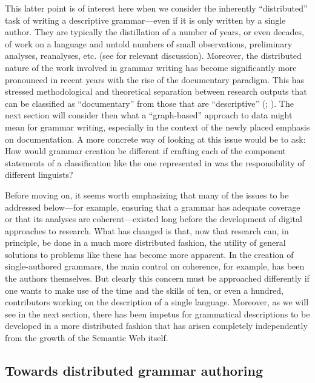 This latter point is of interest here when we consider the inherently
``distributed'' task of writing a descriptive grammar---even if it is only
written by a single author. They are typically the distillation of a number of
years, or even decades, of work on a language and untold numbers of small
observations, preliminary analyses, reanalyses, etc. (see
 for relevant discussion). Moreover, the
distributed nature of the work involved in grammar writing has become
significantly more pronounced in recent years with the rise of the documentary
paradigm. This has stressed methodological and theoretical separation between
research outputs that can be classified as ``documentary'' from those that are
``descriptive'' (;
). The next section will consider then what a
``graph-based'' approach to data might mean for grammar writing, especially in
the context of the newly placed emphasis on documentation. A more concrete way
of looking at this issue would be to ask: How would grammar creation be
different if crafting each of the component statements of a classification like
the one represented in  was the responsibility of different
linguists?

Before moving on, it seems worth emphasizing that many of the issues to be
addressed below---for example, ensuring that a grammar has adequate coverage or
that its analyses are coherent---existed long before the development of digital
approaches to research. What has changed is that, now that research can, in
principle, be done in a much more distributed fashion, the utility of general
solutions to problems like these has become more apparent. In the creation of
single-authored grammars, the main control on coherence, for example, has been
the authors themselves. But clearly this concern must be approached differently
if one wants to make use of the time and the skills of ten, or even a hundred,
contributors working on the description of a single language. Moreover, as we
will see in the next section, there has been impetus for grammatical
descriptions to be developed in a more distributed fashion that has arisen
completely independently from the growth of the Semantic Web itself.


\subsection{Towards distributed grammar authoring\label{Authoring}}


